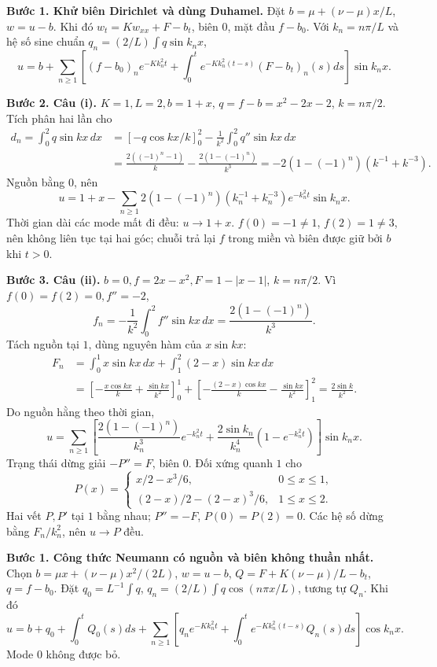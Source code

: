 \textbf{Bước 1. Khử biên Dirichlet và dùng Duhamel.}
Đặt $b=\mu+(\nu-\mu)x/L$, $w=u-b$. Khi đó $w_t=Kw_{xx}+F-b_t$, biên $0$, mặt đầu $f-b_0$. Với $k_n=n\pi/L$ và hệ số sine chuẩn $q_n=(2/L)\int q\sin k_nx$,
\[u=b+\sum_{n\ge1}\left[(f-b_0)_ne^{-Kk_n^2t}
+\int_0^te^{-Kk_n^2(t-s)}(F-b_t)_n(s)ds\right]\sin k_nx.\]

\textbf{Bước 2. Câu (i).} $K=1,L=2,b=1+x$, $q=f-b=x^2-2x-2$, $k=n\pi/2$. Tích phân hai lần cho
\begin{align*}
d_n=\int_0^2q\sin kx\,dx
&=\left[-q\cos kx/k\right]_0^2-\frac1{k^2}\int_0^2q''\sin kx\,dx\\
&=\frac{2((-1)^n-1)}k-\frac{2(1-(-1)^n)}{k^3}
=-2(1-(-1)^n)(k^{-1}+k^{-3}).
\end{align*}
Nguồn bằng $0$, nên
\[u=1+x-\sum_{n\ge1}2(1-(-1)^n)(k_n^{-1}+k_n^{-3})e^{-k_n^2t}\sin k_nx.\]
Thời gian dài các mode mất đi đều: $u\to1+x$. $f(0)=-1\ne1$, $f(2)=1\ne3$, nên không liên tục tại hai góc; chuỗi trả lại $f$ trong miền và biên được giữ bởi $b$ khi $t>0$.

\textbf{Bước 3. Câu (ii).} $b=0,f=2x-x^2,F=1-|x-1|$, $k=n\pi/2$. Vì $f(0)=f(2)=0,f''=-2$,
\[f_n=-\frac1{k^2}\int_0^2f''\sin kx\,dx=\frac{2(1-(-1)^n)}{k^3}.\]
Tách nguồn tại $1$, dùng nguyên hàm của $x\sin kx$:
\begin{align*}
F_n&=\int_0^1x\sin kx\,dx+\int_1^2(2-x)\sin kx\,dx\\
&=\left[-\frac{x\cos kx}k+\frac{\sin kx}{k^2}\right]_0^1
+\left[-\frac{(2-x)\cos kx}k-\frac{\sin kx}{k^2}\right]_1^2
=\frac{2\sin k}{k^2}.
\end{align*}
Do nguồn hằng theo thời gian,
\[u=\sum_{n\ge1}\left[\frac{2(1-(-1)^n)}{k_n^3}e^{-k_n^2t}
+\frac{2\sin k_n}{k_n^4}(1-e^{-k_n^2t})\right]\sin k_nx.\]
Trạng thái dừng giải $-P''=F$, biên $0$. Đối xứng quanh $1$ cho
\[P(x)=\begin{cases}x/2-x^3/6,&0\le x\le1,\\(2-x)/2-(2-x)^3/6,&1\le x\le2.\end{cases}\]
Hai vết $P,P'$ tại $1$ bằng nhau; $P''=-F$, $P(0)=P(2)=0$. Các hệ số dừng bằng $F_n/k_n^2$, nên $u\to P$ đều.

\textbf{Bước 1. Công thức Neumann có nguồn và biên không thuần nhất.}
Chọn $b=\mu x+(\nu-\mu)x^2/(2L)$, $w=u-b$, $Q=F+K(\nu-\mu)/L-b_t$, $q=f-b_0$. Đặt $q_0=L^{-1}\int q$, $q_n=(2/L)\int q\cos(n\pi x/L)$, tương tự $Q_n$. Khi đó
\[u=b+q_0+\int_0^tQ_0(s)ds+
\sum_{n\ge1}\left[q_ne^{-Kk_n^2t}+
\int_0^te^{-Kk_n^2(t-s)}Q_n(s)ds\right]\cos k_nx.\]
Mode $0$ không được bỏ.

